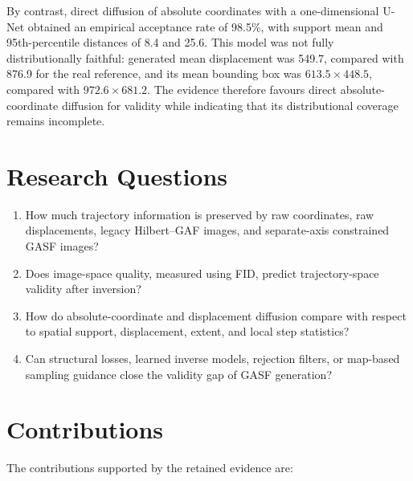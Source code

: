 \documentclass[12pt,a4paper,oneside]{report}
\begin{document}
By contrast, direct diffusion of absolute coordinates with a one-dimensional U-Net obtained an empirical acceptance rate of 98.5\%, with support mean and 95th-percentile distances of 8.4 and 25.6. This model was not fully distributionally faithful: generated mean displacement was 549.7, compared with 876.9 for the real reference, and its mean bounding box was $613.5\times448.5$, compared with $972.6\times681.2$. The evidence therefore favours direct absolute-coordinate diffusion for validity while indicating that its distributional coverage remains incomplete.

\section{Research Questions}

\begin{enumerate}
  \item How much trajectory information is preserved by raw coordinates, raw displacements, legacy Hilbert--GAF images, and separate-axis constrained GASF images?
  \item Does image-space quality, measured using FID, predict trajectory-space validity after inversion?
  \item How do absolute-coordinate and displacement diffusion compare with respect to spatial support, displacement, extent, and local step statistics?
  \item Can structural losses, learned inverse models, rejection filters, or map-based sampling guidance close the validity gap of GASF generation?
\end{enumerate}

\section{Contributions}

The contributions supported by the retained evidence are:
\end{document}
